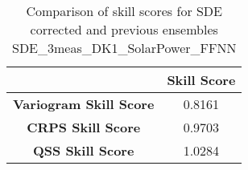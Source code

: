 
        \begin{table}[h!]
            \centering
            \begin{tabular}{|c|c|}
                \hline
                & \textbf{Skill Score}  \\
                \hline
                \textbf{Variogram Skill Score} & 0.8161  \\
                \hline
                \textbf{CRPS Skill Score} & 0.9703  \\
                \hline
                \textbf{QSS Skill Score} & 1.0284 \\
                \hline
            \end{tabular}
            \caption{Comparison of skill scores for SDE corrected and previous ensembles SDE_3meas_DK1_SolarPower_FFNN}
            \label{table:skill_scores_comparison}
        \end{table}
        